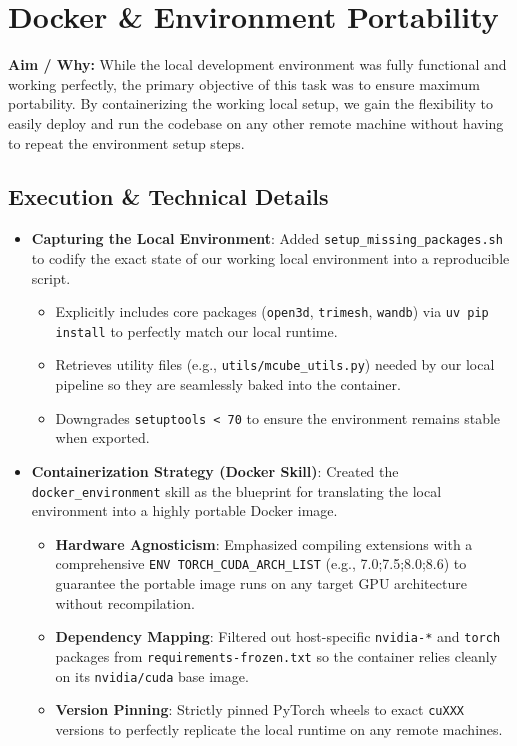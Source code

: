 \section[\textcolor{\statusSecOne}{Docker \& Environment Portability}]{\textcolor{\statusSecOne}{Docker \& Environment Portability}}

\begin{tcolorbox}[title={Status: [Completed]}, colframe=\statusSecOne, colback=\statusSecOne!5]
\textbf{Aim / Why:} While the local development environment was fully functional and working perfectly, the primary objective of this task was to ensure maximum portability. By containerizing the working local setup, we gain the flexibility to easily deploy and run the codebase on any other remote machine without having to repeat the environment setup steps.
\end{tcolorbox}

\subsection{Execution \& Technical Details}
\begin{itemize}
    \item \textbf{Capturing the Local Environment}: 
    Added \texttt{setup\_missing\_packages.sh} to codify the exact state of our working local environment into a reproducible script.
    \begin{itemize}
        \item Explicitly includes core packages (\texttt{open3d}, \texttt{trimesh}, \texttt{wandb}) via \texttt{uv pip install} to perfectly match our local runtime.
        \item Retrieves utility files (e.g., \texttt{utils/mcube\_utils.py}) needed by our local pipeline so they are seamlessly baked into the container.
        \item Downgrades \texttt{setuptools < 70} to ensure the environment remains stable when exported.
    \end{itemize}
    \item \textbf{Containerization Strategy (Docker Skill)}: 
    Created the \texttt{docker\_environment} skill as the blueprint for translating the local environment into a highly portable Docker image.
    \begin{itemize}
        \item \textbf{Hardware Agnosticism}: Emphasized compiling extensions with a comprehensive \texttt{ENV TORCH\_CUDA\_ARCH\_LIST} (e.g., 7.0;7.5;8.0;8.6) to guarantee the portable image runs on any target GPU architecture without recompilation.
        \item \textbf{Dependency Mapping}: Filtered out host-specific \texttt{nvidia-*} and \texttt{torch} packages from \texttt{requirements-frozen.txt} so the container relies cleanly on its \texttt{nvidia/cuda} base image.
        \item \textbf{Version Pinning}: Strictly pinned PyTorch wheels to exact \texttt{cuXXX} versions to perfectly replicate the local runtime on any remote machines.
    \end{itemize}
\end{itemize}

